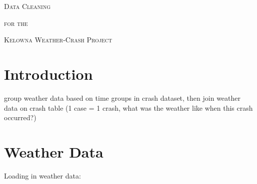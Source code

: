\documentclass[11pt, a4paper]{article}
\begin{document}


\begin{center}
\Large{\textsc{Data Cleaning}}
\par
\normalsize{\textsc{for the}}
\par
\large{\textsc{Kelowna Weather-Crash Project}}
\end{center}


\vspace{0.917 pc} %

\tableofcontents


\pagebreak
\section{Introduction}



group weather data based on time groups in crash dataset, then join weather data on crash table (1 case = 1 crash, what was the weather like when this crash occurred?)




\pagebreak
\section{Weather Data}
Loading in weather data:
\end{document}
